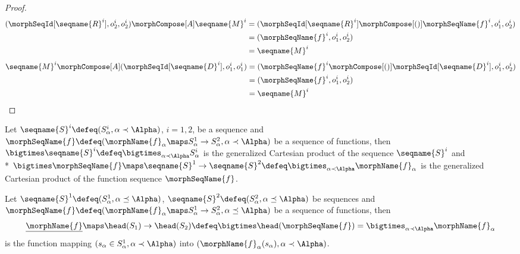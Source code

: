\documentclass{article}
\begin{document}
\begin{lemma}
\begin{proof}
\begin{equation*}
\begin{split}
  (\morphSeqId[\seqname{R}^i], o^i_2, o^i_2) \morphCompose[A] \seqname{M}^i
  & =
  (\morphSeqId[\seqname{R}^i] \morphCompose[()] \morphSeqName{f}^i, o^i_1, o^i_2)
\\*
  & =
  (\morphSeqName{f}^i, o^i_1, o^i_2)
\\*
  & =
 \seqname{M}^i
\end{split}
\end{equation*}
\begin{equation*}
\begin{split}
  \seqname{M}^i \morphCompose[A] (\morphSeqId[\seqname{D}^i], o^i_1, o^i_1)
  & =
  (\morphSeqName{f}^i \morphCompose[()] \morphSeqId[\seqname{D}^i], o^i_1, o^i_2)
\\*
  & =
  (\morphSeqName{f}^i, o^i_1, o^i_2)
\\*
  & =
 \seqname{M}^i
\end{split}
\end{equation*}
\end{proof}
\end{lemma}

\begin{definition}
\label{def:Cart}
Let $\seqname{S}^i \defeq (S^i_\alpha, \alpha \prec \Alpha)$, $i=1,2$,
be a sequence and
$\morphSeqName{f} \defeq (\morphName{f}_\alpha \maps S^1_\alpha \to
S^2_\alpha, \alpha \prec \Alpha)$
be a sequence of functions, then
$
  \bigtimes \seqname{S}^i \defeq
  \bigtimes_{\alpha \prec \Alpha} S^i_\alpha
$
is the generalized Cartesian product of the sequence $\seqname{S}^i$ and \\*
\donotbreak
  {
    $
      \bigtimes \morphSeqName{f} \maps \seqname{S}^1 \to \seqname{S}^2
      \defeq
      \bigtimes_{\alpha \prec \Alpha}\morphName{f}_\alpha
    $
  }
is the generalized Cartesian product of the function sequence
$\morphSeqName{f}$.
\end{definition}

\begin{definition}[underline]
Let $\seqname{S}^1 \defeq (S^1_\alpha, \alpha \preceq \Alpha)$,
$\seqname{S}^2 \defeq (S^2_\alpha, \alpha \preceq \Alpha)$ be
sequences and
$
  \morphSeqName{f} \defeq
  (
    \morphName{f}_\alpha \maps S^1_\alpha \to S^2_\alpha,
    \alpha \preceq \Alpha
  )
$
be a sequence of functions, then
\begin{equation}
\underline{\morphName{f}} \maps \head(S_1) \to \head(S_2) \defeq
\bigtimes \head(\morphSeqName{f}) =
\bigtimes_{\alpha \prec \Alpha} \morphName{f}_\alpha
\end{equation}
is the function mapping
$(s_\alpha \in S^1_\alpha, \alpha \prec \Alpha)$
into $(\morphName{f}_\alpha(s_\alpha), \alpha \prec \Alpha)$.
\end{definition}
\end{document}
